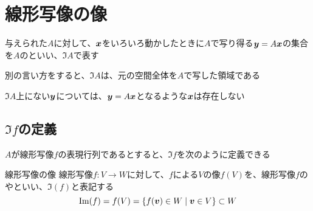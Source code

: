 \documentclass[../../../topic_linear-algebra]{subfiles}
\begin{document}
\sectionline
\section{線形写像の像}

与えられた$A$に対して、$\vb*{x}$をいろいろ動かしたときに$A$で写り得る$\vb*{y} = A\vb*{x}$の集合を$A$のといい、$\Im A$で表す

\br

別の言い方をすると、$\Im A$は、元の空間全体を$A$で写した領域である

$\Im A$上にない$\vb*{y}$については、$\vb*{y} = A\vb*{x}$となるような$\vb*{x}$は存在しない

\subsection{$\Im f$の定義}

$A$が線形写像$f$の表現行列であるとすると、$\Im f$を次のように定義できる

\begin{definition}{線形写像の像}
  線形写像$f\colon V \to W$に対して、$f$による$V$の像$f(V)$を、線形写像$f$のやといい、$\Im(f)$と表記する
  \begin{equation*}
    \Im(f) = f(V) = \{ f(\vb*{v}) \in W \mid \vb*{v} \in V \} \subset W
  \end{equation*}
\end{definition}
\end{document}
